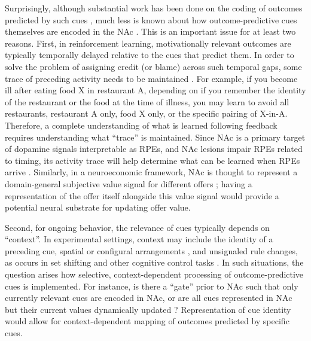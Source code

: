 \documentclass[11pt]{article}
\let\cite=\citep
\providecommand{\DIFadd}[1]{{\protect\color{red} \sf #1}} %
\providecommand{\DIFdel}[1]{} %
\providecommand{\DIFaddbegin}{} %
\providecommand{\DIFaddend}{} %
\providecommand{\DIFdelbegin}{} %
\providecommand{\DIFdelend}{} %
\newcommand{\DIFscaledelfig}{0.5}
\newlength{\DIFdelgraphicswidth} %
\newlength{\DIFdelgraphicsheight} %
\newcommand{\DIFaddincludegraphics}[2][]{{\color{red}\fbox{\DIFOincludegraphics[#1]{#2}}}} %
\newcommand{\DIFdelincludegraphics}[2][]{%
\sbox{\DIFdelgraphicsbox}{\DIFOincludegraphics[#1]{#2}}%
\settoboxwidth{\DIFdelgraphicswidth}{\DIFdelgraphicsbox} %
\settoboxtotalheight{\DIFdelgraphicsheight}{\DIFdelgraphicsbox} %
\scalebox{\DIFscaledelfig}{%
\parbox[b]{\DIFdelgraphicswidth}{\usebox{\DIFdelgraphicsbox}\\[-\baselineskip] \rule{\DIFdelgraphicswidth}{0em}}\llap{\resizebox{\DIFdelgraphicswidth}{\DIFdelgraphicsheight}{%
\setlength{\unitlength}{\DIFdelgraphicswidth}%
\begin{picture}(1,1)%
\thicklines\linethickness{2pt} %
{\color[rgb]{1,0,0}\put(0,0){\framebox(1,1){}}}%
{\color[rgb]{1,0,0}\put(0,0){\line( 1,1){1}}}%
{\color[rgb]{1,0,0}\put(0,1){\line(1,-1){1}}}%
\end{picture}%
}\hspace*{3pt}}} %
} %
\DeclareRobustCommand{\DIFaddbegin}{\DIFOaddbegin \let\includegraphics\DIFaddincludegraphics} %
\DeclareRobustCommand{\DIFaddend}{\DIFOaddend \let\includegraphics\DIFOincludegraphics} %
\DeclareRobustCommand{\DIFdelbegin}{\DIFOdelbegin \let\includegraphics\DIFdelincludegraphics} %
\DeclareRobustCommand{\DIFdelend}{\DIFOaddend \let\includegraphics\DIFOincludegraphics} %
\begin{document}
Surprisingly, although substantial work has been done on the coding of
outcomes predicted by such cues
\DIFdelbegin \DIFdel{\cite{Hollerman1998,Setlow2003,Nicola2004,Roitman2005,Day2006,Roesch2009a,Saddoris2011,Goldstein2012,Lansink2012,Bissonette2013,McGinty2013,Atallah2014,Sugam2014,Cooch2015,West2016}}\DIFdelend \DIFaddbegin \DIFadd{\cite{Schultz1992,Hollerman1998,Hassani2001,Cromwell2003,Setlow2003,Nicola2004,Roitman2005,Day2006,Roesch2009a,Saddoris2011,Goldstein2012,Lansink2012,Bissonette2013,McGinty2013,Atallah2014,Sugam2014,Cooch2015,West2016}}\DIFaddend ,
much less is known about how outcome-predictive cues themselves are
encoded in the NAc \cite[but see;][]{Sleezer2016}. This is an
important issue for at least two reasons. First, in reinforcement
learning, motivationally relevant outcomes are typically temporally
delayed relative to the cues that predict them. In order to solve the
problem of assigning credit (or blame) across such temporal gaps, some
trace of preceding activity needs to be maintained
\cite{sutton1998,Lee2012}. For example, if you become ill after eating
food X in restaurant A, depending on if you remember the identity of
the restaurant or the food at the time of illness, you may learn to
avoid all restaurants, restaurant A only, food X only, or the specific
pairing of X-in-A. Therefore, a complete understanding of what is
learned following feedback requires understanding what “trace” is
maintained. Since NAc is a primary target of \DIFdelbegin \DIFdel{DA }\DIFdelend \DIFaddbegin \DIFadd{dopamine }\DIFaddend signals interpretable
as RPEs, and NAc lesions impair RPEs related to timing, its activity
trace will help determine what can be learned when RPEs arrive
\cite{Ikemoto2007,McDannald2011,Hart2014,Hamid2016,Takahashi2016}. \DIFaddbegin \DIFadd{Similarly,
in a neuroeconomic framework, NAc is thought to represent a
domain-general subjective value signal for different offers
\cite{Peters2009,Levy2012,Bartra2013,Sescousse2015}; having a representation of
the offer itself alongside this value signal would provide a potential neural substrate for updating offer
value.
}\DIFaddend 

Second, for ongoing behavior, the relevance of cues typically depends
on “context”. In experimental settings, context may include the
identity of a preceding cue, spatial or configural arrangements
\cite{Holland1992,Bouton1993,Honey2014}, and unsignaled \DIFdelbegin \DIFdel{rules }\DIFdelend \DIFaddbegin \DIFadd{rule changes, }\DIFaddend as
occurs in set shifting and other cognitive control tasks
\cite{Grant1948,cohen1992context,Floresco2006a,Sleezer2016}. In such
situations, the question arises how selective, context-dependent
processing of outcome-predictive cues is implemented. For instance, is
there a “gate” prior to NAc such that only currently relevant cues are
encoded in NAc, or are all cues represented in NAc but their current
values dynamically updated
\cite{Goto2008,Fitzgerald2014,Sleezer2016}\DIFdelbegin \DIFdel{. }\DIFdelend \DIFaddbegin \DIFadd{? }\DIFaddend Representation of cue
identity would allow for context-dependent mapping of outcomes
predicted by specific cues.
\end{document}
